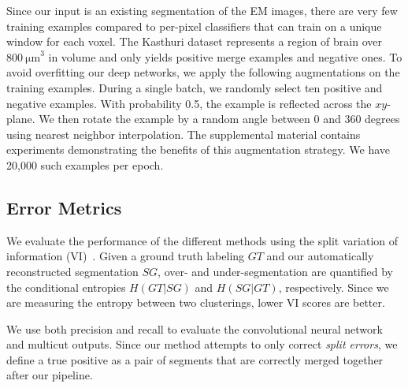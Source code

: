 Since our input is an existing segmentation of the EM images, there are very few training examples compared to per-pixel classifiers that can train on a unique window for each voxel. 
The Kasthuri dataset represents a region of brain over $\SI[product-units=single]{800}{\micro\meter}^3$ in volume and only yields  positive merge examples and  negative ones.
To avoid overfitting our deep networks, we apply the following augmentations on the training examples.
During a single batch, we randomly select ten positive and negative examples. 
With probability 0.5, the example is reflected across the $xy$-plane. 
We then rotate the example by a random angle between $0$ and $360$ degrees using nearest neighbor interpolation. 
The supplemental material contains experiments demonstrating the benefits of this augmentation strategy.
We have 20,000 such examples per epoch.


\subsection{Error Metrics}
\label{sec:variation-of-information}

We evaluate the performance of the different methods using the split variation of information (VI)~\cite{meila2003comparing}.
Given a ground truth labeling $GT$ and our automatically reconstructed segmentation $SG$, over- and under-segmentation are quantified by the conditional entropies $H(GT | SG)$ and $H(SG | GT)$, respectively. 
Since we are measuring the entropy between two clusterings, lower VI scores are better.

We use both precision and recall to evaluate the convolutional neural network and multicut outputs. 
Since our method attempts to only correct \textit{split errors}, we define a true positive as a pair of segments that are correctly merged together after our pipeline.